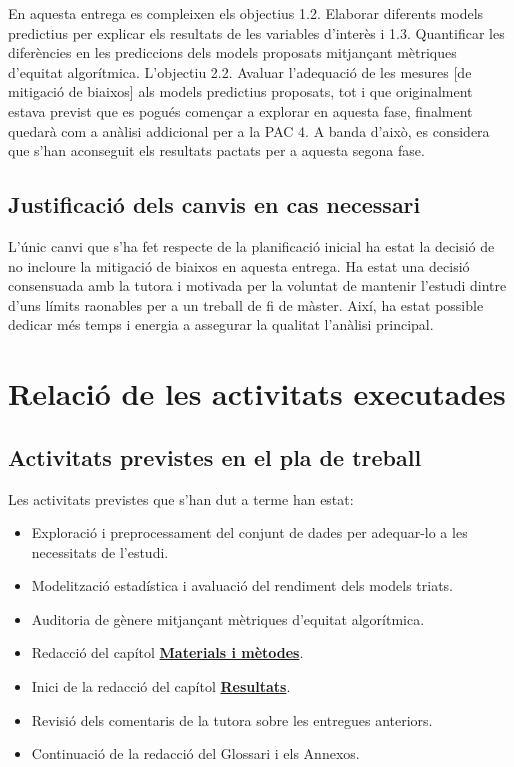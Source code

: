 \documentclass[CAT]{TFUOC}%
\providecommand{\tightlist}{\setlength{\itemsep}{0pt}\setlength{\parskip}{0pt}}
\begin{document}
En aquesta entrega es compleixen els objectius 1.2. Elaborar diferents models predictius per explicar els resultats de les variables d'interès i 1.3. Quantificar les diferències en les prediccions dels models proposats mitjançant mètriques d'equitat algorítmica. L'objectiu 2.2. Avaluar l'adequació de les mesures {[}de mitigació de biaixos{]} als models predictius proposats, tot i que originalment estava previst que es pogués començar a explorar en aquesta fase, finalment quedarà com a anàlisi addicional per a la PAC 4. A banda d'això, es considera que s'han aconseguit els resultats pactats per a aquesta segona fase.

\subsection{Justificació dels canvis en cas necessari}\label{justificaciuxf3-dels-canvis-en-cas-necessari-1}

L'únic canvi que s'ha fet respecte de la planificació inicial ha estat la decisió de no incloure la mitigació de biaixos en aquesta entrega. Ha estat una decisió consensuada amb la tutora i motivada per la voluntat de mantenir l'estudi dintre d'uns límits raonables per a un treball de fi de màster. Així, ha estat possible dedicar més temps i energia a assegurar la qualitat l'anàlisi principal.

\section{Relació de les activitats executades}\label{relaciuxf3-de-les-activitats-executades-1}

\subsection{Activitats previstes en el pla de treball}\label{activitats-previstes-en-el-pla-de-treball-1}

Les activitats previstes que s'han dut a terme han estat:

\begin{itemize}
\tightlist
\item
  Exploració i preprocessament del conjunt de dades per adequar-lo a les necessitats de l'estudi.
\item
  Modelització estadística i avaluació del rendiment dels models triats.
\item
  Auditoria de gènere mitjançant mètriques d'equitat algorítmica.
\item
  Redacció del capítol \textbf{\hyperref[materials-i-muxe8todes]{Materials i mètodes}}.
\item
  Inici de la redacció del capítol \textbf{\hyperref[resultats]{Resultats}}.
\item
  Revisió dels comentaris de la tutora sobre les entregues anteriors.
\item
  Continuació de la redacció del Glossari i els Annexos.
\end{itemize}
\end{document}
